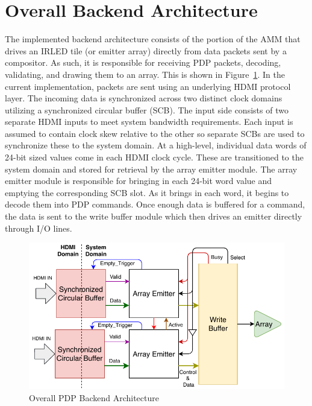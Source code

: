 \section{Overall Backend Architecture}
    \label{sec:backend_arch}
    The implemented backend architecture consists of the portion of the AMM that drives an IRLED tile (or emitter array) directly from data packets sent by a compositor. As such, it is responsible for receiving PDP packets, decoding, validating, and drawing them to an array. This is shown in Figure~\ref{fig:overall_arch}. In the current implementation, packets are sent using an underlying HDMI protocol layer. The incoming data is synchronized across two distinct clock domains utilizing a synchronized circular buffer (SCB). The input side consists of two separate HDMI inputs to meet system bandwidth requirements. Each input is assumed to contain clock skew relative to the other so separate SCBs are used to synchronize these to the system domain. At a high-level, individual data words of 24-bit sized values come in each HDMI clock cycle. These are transitioned to the system domain and stored for retrieval by the array emitter module. The array emitter module is responsible for bringing in each 24-bit word value and emptying the corresponding SCB slot. As it brings in each word, it begins to decode them into PDP commands. Once enough data is buffered for a command, the data is sent to the write buffer module which then drives an emitter directly through I/O lines.

    \begin{figure}
        \centering
        \includegraphics[width=1.0\textwidth]{fig/pdp_overall_arch.pdf}
        \caption{Overall PDP Backend Architecture}
        \label{fig:overall_arch}
    \end{figure}

